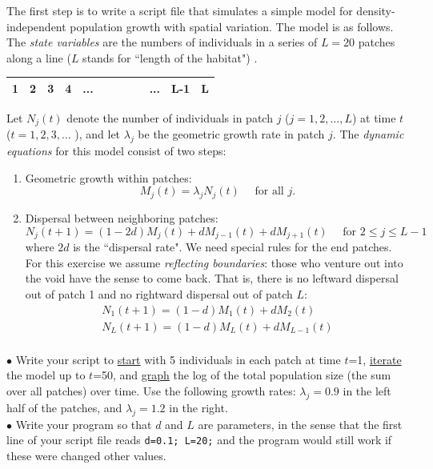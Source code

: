 \documentclass [11pt]{article}
\newcounter{exercise}
\numberwithin{exercise}{section}
\begin{document}
The first step is to write a script file that simulates a simple model for density-independent 
population growth with spatial variation. The model is as follows. The \textit{state variables}  
are the numbers of individuals in a series of $L = 20$ 
patches along a line ($L$ stands for ``length of the habitat") . 
\begin{table}
\begin{tabular}
{|p{22pt}|p{22pt}|p{22pt}|p{22pt}|p{22pt}|p{22pt}|p{22pt}|p{22pt}|p{22pt}|p{22pt}|p{22pt}|p{22pt}|}
\hline
1& 
2& 
3& 
4& 
... & 
& 
& 
& 
& 
...& 
L-1& 
L \\
\hline
\end{tabular}
\end{table}

Let $N_j(t)$ denote the number of individuals in patch $j$ ($j=1,2,\ldots, L$) at 
time $t$ ($t=1,2,3,\ldots$ ), and let $\lambda _j$ be the geometric growth rate 
in patch $j$. The \textit{dynamic equations} for this model consist of two steps:
\begin{enumerate}
\item Geometric growth within patches: 
\begin{equation}
M_j(t) = \lambda _j N_j(t) \quad \mbox{ for all } j. 
\end{equation}
\item Dispersal between neighboring patches:
\begin{equation}
N_j(t + 1) = (1 - 2d)M_j(t) + dM_{j - 1}(t) + dM_{j + 1}(t) \quad \mbox{ for } 2 \le j \le L-1 
\label{disperse1}
\end{equation}
where $2d$ is the ``dispersal rate". We need special rules for the end patches. 
For this exercise we assume \textit{reflecting boundaries}: those who venture out 
into the void have the sense to come back. That is, there is no 
leftward dispersal out of patch 1 and no rightward dispersal out of patch $L$:
\begin{equation}
\begin{array}{l}
 N_1(t + 1) = (1 - d)M_1(t) + dM_2(t) \\ 
 N_L(t + 1) = (1 - d)M_L(t) + dM_{L - 1}(t) \\ 
\end{array}
\label{disperse2}
\end{equation}
\end{enumerate} 
$\bullet$ Write your script to \underline{start} with 5 individuals in each patch at 
time $t$=1, \underline{iterate} the model up to $t$=50, and \underline{graph} 
the log of the total population size (the sum over all patches) over time. Use the 
following growth rates: $\lambda _j = 0.9$ in the left half of the patches, 
and $\lambda _j = 1.2$ in the right. \\
$\bullet$ Write your program so that $d$ and $L$ are parameters, 
in the sense that the first line of your script file reads \texttt{d=0.1; L=20;} 
and the program would still work if these were changed other values. 
\end{document}
